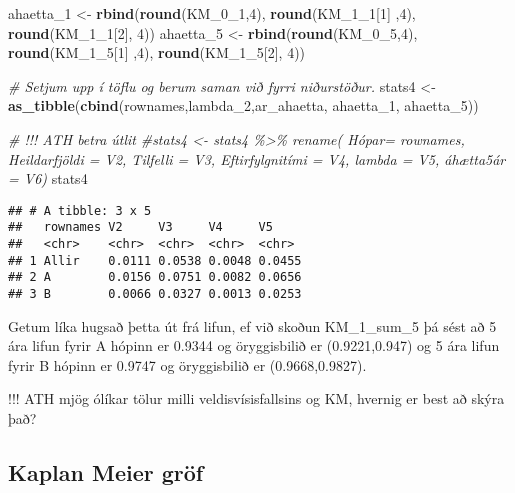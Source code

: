 \documentclass[
]{book}
\newenvironment{Shaded}{\begin{snugshade}}{\end{snugshade}}
\newcommand{\CommentTok}[1]{\textcolor[rgb]{0.56,0.35,0.01}{\textit{#1}}}
\newcommand{\DecValTok}[1]{\textcolor[rgb]{0.00,0.00,0.81}{#1}}
\newcommand{\KeywordTok}[1]{\textcolor[rgb]{0.13,0.29,0.53}{\textbf{#1}}}
\newcommand{\NormalTok}[1]{#1}
\newcommand{\StringTok}[1]{\textcolor[rgb]{0.31,0.60,0.02}{#1}}
\begin{document}
\begin{Shaded}
\begin{Highlighting}[]
\NormalTok{ahaetta\_}\DecValTok{1}\NormalTok{ <{-}}\StringTok{ }\KeywordTok{rbind}\NormalTok{(}\KeywordTok{round}\NormalTok{(KM\_}\DecValTok{0}\NormalTok{\_}\DecValTok{1}\NormalTok{,}\DecValTok{4}\NormalTok{), }\KeywordTok{round}\NormalTok{(KM\_}\DecValTok{1}\NormalTok{\_}\DecValTok{1}\NormalTok{[}\DecValTok{1}\NormalTok{] ,}\DecValTok{4}\NormalTok{), }\KeywordTok{round}\NormalTok{(KM\_}\DecValTok{1}\NormalTok{\_}\DecValTok{1}\NormalTok{[}\DecValTok{2}\NormalTok{], }\DecValTok{4}\NormalTok{))}
\NormalTok{ahaetta\_}\DecValTok{5}\NormalTok{ <{-}}\StringTok{ }\KeywordTok{rbind}\NormalTok{(}\KeywordTok{round}\NormalTok{(KM\_}\DecValTok{0}\NormalTok{\_}\DecValTok{5}\NormalTok{,}\DecValTok{4}\NormalTok{), }\KeywordTok{round}\NormalTok{(KM\_}\DecValTok{1}\NormalTok{\_}\DecValTok{5}\NormalTok{[}\DecValTok{1}\NormalTok{] ,}\DecValTok{4}\NormalTok{), }\KeywordTok{round}\NormalTok{(KM\_}\DecValTok{1}\NormalTok{\_}\DecValTok{5}\NormalTok{[}\DecValTok{2}\NormalTok{], }\DecValTok{4}\NormalTok{))}

\CommentTok{\# Setjum upp í töflu og berum saman við fyrri niðurstöður.}
\NormalTok{stats4 <{-}}\StringTok{ }\KeywordTok{as\_tibble}\NormalTok{(}\KeywordTok{cbind}\NormalTok{(rownames,lambda\_}\DecValTok{2}\NormalTok{,ar\_ahaetta, ahaetta\_}\DecValTok{1}\NormalTok{, ahaetta\_}\DecValTok{5}\NormalTok{))}

\CommentTok{\# !!! ATH betra útlit}
\CommentTok{\#stats4 <{-} stats4 \%>\% rename( Hópar= rownames, Heildarfjöldi = V2,  Tilfelli = V3, Eftirfylgnitími = V4, lambda = V5, áhætta5ár = V6)}
\NormalTok{stats4}
\end{Highlighting}
\end{Shaded}

\begin{verbatim}
## # A tibble: 3 x 5
##   rownames V2     V3     V4     V5    
##   <chr>    <chr>  <chr>  <chr>  <chr> 
## 1 Allir    0.0111 0.0538 0.0048 0.0455
## 2 A        0.0156 0.0751 0.0082 0.0656
## 3 B        0.0066 0.0327 0.0013 0.0253
\end{verbatim}

Getum líka hugsað þetta út frá lifun, ef við skoðun KM\_1\_sum\_5 þá sést að 5 ára lifun fyrir A hópinn er 0.9344 og öryggisbilið er (0.9221,0.947) og 5 ára lifun fyrir B hópinn er 0.9747 og öryggisbilið er (0.9668,0.9827).

!!! ATH mjög ólíkar tölur milli veldisvísisfallsins og KM, hvernig er best að skýra það?

\hypertarget{kaplan-meier-gruxf6f}{%
\subsection{Kaplan Meier gröf}\label{kaplan-meier-gruxf6f}}
\end{document}

